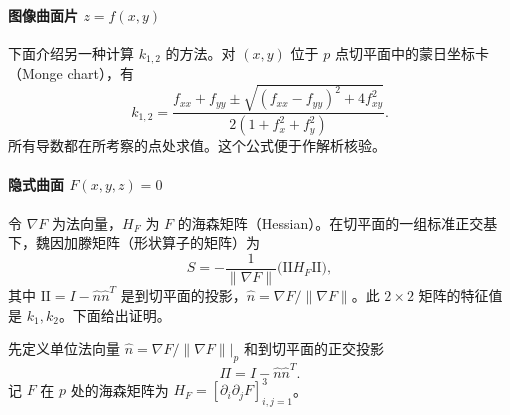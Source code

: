 \paragraph{图像曲面片 \texorpdfstring{$z=f(x,y)$}{z=f(x,y)}}
下面介绍另一种计算 $k_{1,2}$ 的方法。对 $(x,y)$ 位于 $p$ 点切平面中的蒙日坐标卡（Monge chart），有
\[
  k_{1,2}=\frac{f_{xx}+f_{yy}\pm\sqrt{(f_{xx}-f_{yy})^2+4f_{xy}^2}}
     {2(1+f_x^2+f_y^2)}.
\]
所有导数都在所考察的点处求值。这个公式便于作解析核验。

\paragraph{隐式曲面 \texorpdfstring{$F(x,y,z)=0$}{F(x,y,z)=0}}
令 $\nabla F$ 为法向量，$H_F$ 为 $F$ 的海森矩阵（Hessian）。在切平面的一组标准正交基下，魏因加滕矩阵（形状算子的矩阵）为
\begin{equation*}
  S=-\frac{1}{\lVert\nabla F\rVert}\bigl(\mathrm{II}H_F\mathrm{II}\bigr),
  \tag{5.16}\label{eq:5.16}
\end{equation*}
其中 $\mathrm{II}=I-\hat n\hat n^T$ 是到切平面的投影，$\hat n=\nabla F/\lVert\nabla F\rVert$。此 $2\times2$ 矩阵的特征值是 $k_1,k_2$。下面给出证明。

先定义单位法向量 $\hat n=\left.\nabla F/\lVert\nabla F\rVert\right|_p$ 和到切平面的正交投影
\[
  \Pi=I-\hat n\hat n^T.
\]
记 $F$ 在 $p$ 处的海森矩阵为 $H_F=[\partial_i\partial_j F]_{i,j=1}^3$。

